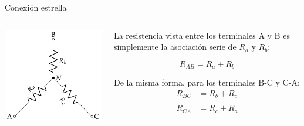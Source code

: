 \documentclass[aspectratio=169, xcolor={usenames,svgnames,dvipsnames}]{beamer}
\begin{document}
\begin{frame}{Conexión estrella}
    \begin{columns}
    \begin{column}{0.4\columnwidth}
    \begin{center}
    \includegraphics[width=1.1\linewidth]{../figs/Conexion_Estrella.pdf}
    \end{center}
    \end{column}
    \begin{column}{0.5\columnwidth}
    La resistencia \alert{vista entre los terminales} A y B es simplemente la asociación serie de $R_{a}$ y $R_{b}$:
    
    \begin{equation*}
        R_{AB} = R_a + R_b
    \end{equation*}    
    \vspace{1mm}
    
    De la misma forma, para los terminales B-C y C-A:  
    \begin{align*}
      R_{BC} &= R_b + R_c\\
      \\
      R_{CA} &= R_c + R_a\\
    \end{align*}
    \end{column}
    \end{columns}
\end{frame}
\end{document}

